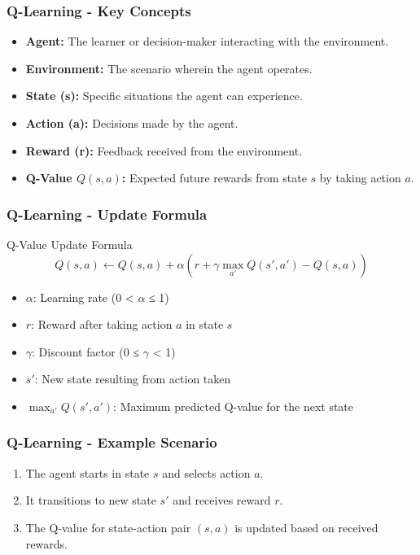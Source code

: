 \documentclass[aspectratio=169]{beamer}
\begin{document}
\begin{frame}[fragile]
    \frametitle{Q-Learning - Key Concepts}
    \begin{itemize}
        \item \textbf{Agent:} The learner or decision-maker interacting with the environment.
        \item \textbf{Environment:} The scenario wherein the agent operates.
        \item \textbf{State (s):} Specific situations the agent can experience.
        \item \textbf{Action (a):} Decisions made by the agent.
        \item \textbf{Reward (r):} Feedback received from the environment.
        \item \textbf{Q-Value \( Q(s, a) \):} Expected future rewards from state \( s \) by taking action \( a \).
    \end{itemize}
\end{frame}

\begin{frame}[fragile]
    \frametitle{Q-Learning - Update Formula}
    \begin{block}{Q-Value Update Formula}
        \[
        Q(s, a) \gets Q(s, a) + \alpha \left( r + \gamma \max_{a'} Q(s', a') - Q(s, a) \right)
        \]
    \end{block}
    \begin{itemize}
        \item \( \alpha \): Learning rate (0 < \( \alpha \) ≤ 1)
        \item \( r \): Reward after taking action \( a \) in state \( s \)
        \item \( \gamma \): Discount factor (0 ≤ \( \gamma \) < 1)
        \item \( s' \): New state resulting from action taken
        \item \( \max_{a'} Q(s', a') \): Maximum predicted Q-value for the next state
    \end{itemize}
\end{frame}

\begin{frame}[fragile]
    \frametitle{Q-Learning - Example Scenario}
    \begin{enumerate}
        \item The agent starts in state \( s \) and selects action \( a \).
        \item It transitions to new state \( s' \) and receives reward \( r \).
        \item The Q-value for state-action pair \( (s, a) \) is updated based on received rewards.
    \end{enumerate}
\end{frame}
\end{document}

